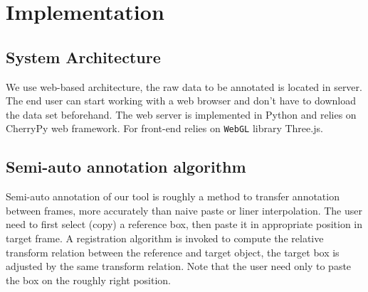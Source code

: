\documentclass[letterpaper, 10 pt, conference]{ieeeconf}  %
\begin{document}
\section{Implementation}
\label{Implementation}

\subsection{System Architecture}
We use web-based architecture, the raw data to be annotated is located in server. The end user can start working with a web browser and don't have to download the data set beforehand. The web server is implemented in Python and relies on CherryPy web framework\cite{cherrypy}. For front-end relies on \texttt{WebGL} library Three.js\cite{threejs}.


\subsection{Semi-auto annotation algorithm}

Semi-auto annotation of our tool is roughly a method to transfer annotation between frames, more accurately than naive paste or liner interpolation. The user need to first select (copy) a reference box, then paste it in appropriate position in target frame. A registration algorithm is invoked to compute the relative transform relation between the reference and target object, the target box is adjusted by the same transform relation. Note that the user need only to paste the box on the roughly right position.
\end{document}
